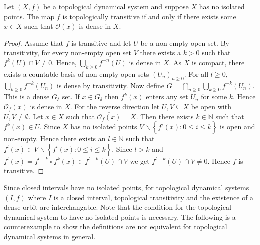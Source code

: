 \begin{prop} \label{prop:dense-transitive}
    Let $(X, f)$ be a topological dynamical system and suppose $X$ has no isolated points. The map $f$ is topologically transitive if and only if there exists some $x \in X$ such that $\mathcal{O}(x)$ is dense in $X$.
    \begin{proof}
        Assume that $f$ is transitive and let $U$ be a non-empty open set. By transitivity, for every non-empty open set $V$ there exists a $k > 0$ such that $f^k(U) \cap V \neq 0$. Hence, $\bigcup_{k \geq 0}f^{-n}(U)$ is dense in $X$. As $X$ is compact, there exists a countable basis of non-empty open sets $(U_n)_{n \geq 0}$. For all $l \geq 0$, $\bigcup_{k \geq 0}f^{-k}(U_n)$ is dense by transitivity. Now define $G = \bigcap_{n \geq 0}\bigcup_{k \geq 0}f^{-k}(U_n)$. This is a dense $G_\delta$ set. If $x \in G_\delta$ then $f^k(x)$ enters any set $U_n$ for some $k$. Hence $\mathcal{O}_f(x)$ is dense in $X$. For the reverse direction let $U, V \subseteq X$ be open with $U, V \neq \emptyset$. Let $x \in X$ such that $\overline{\mathcal{O}_f(x)} = X$. Then there exists $k \in \mathbb{N}$ such that $f^k(x) \in U$. Since $X$ has no isolated points $V\, \backslash \left\lbrace f^i(x) : 0 \leq i \leq k \right\rbrace$ is open and non-empty. Hence there exists an $l \in \mathbb{N}$ such that $f^l(x) \in V\, \backslash \left\lbrace f^i(x) : 0 \leq i \leq k \right\rbrace$. Since $l > k$ and $f^l(x) = f^{l - k} \circ f^{k}(x) \in f^{l - k}(U) \cap V$ we get $f^{l - k}(U) \cap V \neq 0$. Hence $f$ is transitive.
    \end{proof}
\end{prop}

Since closed intervals have no isolated points, for topological dynamical systems $(I, f)$ where $I$ is a closed interval, topological transitivity and the existence of a dense orbit are interchangable. Note that the condition for the topological dynamical system to have no isolated points is necessary. The following is a counterexample to show the definitions are not equivalent for topological dynamical systems in general.

